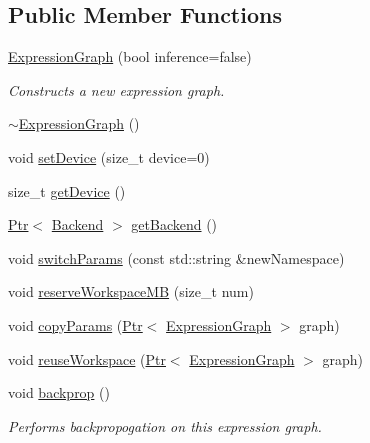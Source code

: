 \subsection*{Public Member Functions}
\begin{DoxyCompactItemize}
\item 
\hyperlink{classmarian_1_1ExpressionGraph_a40b3f2a4c0bacb782241f321bd1d429c}{Expression\+Graph} (bool inference=false)
\begin{DoxyCompactList}\small\item\em Constructs a new expression graph. \end{DoxyCompactList}\item 
\hyperlink{classmarian_1_1ExpressionGraph_a9dbcf2ff5e7ad496082daab4c71e4ea4}{$\sim$\+Expression\+Graph} ()
\item 
void \hyperlink{classmarian_1_1ExpressionGraph_a887b328e3073bbdef1869ae6ff632ca4}{set\+Device} (size\+\_\+t device=0)
\item 
size\+\_\+t \hyperlink{classmarian_1_1ExpressionGraph_a6de2782630380b0b2d3a1ded6db5324d}{get\+Device} ()
\item 
\hyperlink{namespacemarian_ad1a373be43a00ef9ce35666145137b08}{Ptr}$<$ \hyperlink{classmarian_1_1Backend}{Backend} $>$ \hyperlink{classmarian_1_1ExpressionGraph_a714920827388a0d6f880a90c2e5e5be0}{get\+Backend} ()
\item 
void \hyperlink{classmarian_1_1ExpressionGraph_aec6911dc81df2dfbfb2c3ee6cfa6532a}{switch\+Params} (const std\+::string \&new\+Namespace)
\item 
void \hyperlink{classmarian_1_1ExpressionGraph_ae746a90c60109c20fd154ec6f491ea0e}{reserve\+Workspace\+MB} (size\+\_\+t num)
\item 
void \hyperlink{classmarian_1_1ExpressionGraph_a9b2b3ec0ad988aad229f779416632aa8}{copy\+Params} (\hyperlink{namespacemarian_ad1a373be43a00ef9ce35666145137b08}{Ptr}$<$ \hyperlink{classmarian_1_1ExpressionGraph}{Expression\+Graph} $>$ graph)
\item 
void \hyperlink{classmarian_1_1ExpressionGraph_a9ffa36f849946ba0153bd0e8f18e31f9}{reuse\+Workspace} (\hyperlink{namespacemarian_ad1a373be43a00ef9ce35666145137b08}{Ptr}$<$ \hyperlink{classmarian_1_1ExpressionGraph}{Expression\+Graph} $>$ graph)
\item 
void \hyperlink{classmarian_1_1ExpressionGraph_aac6f1862944bd673e6874662d9d4b465}{backprop} ()
\begin{DoxyCompactList}\small\item\em Performs backpropogation on this expression graph. \end{DoxyCompactList}\item 

\end{DoxyCompactItemize}

